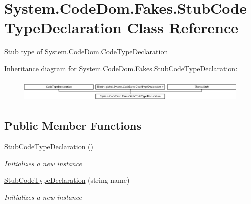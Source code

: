 \hypertarget{class_system_1_1_code_dom_1_1_fakes_1_1_stub_code_type_declaration}{\section{System.\-Code\-Dom.\-Fakes.\-Stub\-Code\-Type\-Declaration Class Reference}
\label{class_system_1_1_code_dom_1_1_fakes_1_1_stub_code_type_declaration}
}


Stub type of System.\-Code\-Dom.\-Code\-Type\-Declaration 


Inheritance diagram for System.\-Code\-Dom.\-Fakes.\-Stub\-Code\-Type\-Declaration\-:\begin{figure}[H]
\begin{center}
\leavevmode
\includegraphics[height=1.111111cm]{class_system_1_1_code_dom_1_1_fakes_1_1_stub_code_type_declaration}
\end{center}
\end{figure}
\subsection*{Public Member Functions}
\begin{DoxyCompactItemize}
\item 
\hyperlink{class_system_1_1_code_dom_1_1_fakes_1_1_stub_code_type_declaration_a5edd325bf861f9bcd443b77a65ffece1}{Stub\-Code\-Type\-Declaration} ()
\begin{DoxyCompactList}\small\item\em Initializes a new instance\end{DoxyCompactList}\item 
\hyperlink{class_system_1_1_code_dom_1_1_fakes_1_1_stub_code_type_declaration_a98329eaedcee7a704232c1858b4706b2}{Stub\-Code\-Type\-Declaration} (string name)
\begin{DoxyCompactList}\small\item\em Initializes a new instance\end{DoxyCompactList}\end{DoxyCompactItemize}
